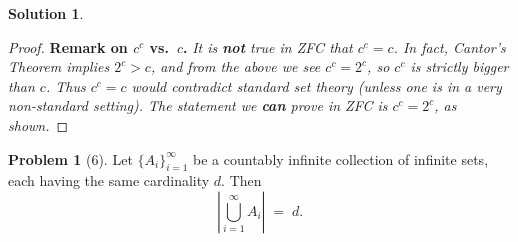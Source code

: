 \documentclass[12pt]{article}
\theoremstyle{definition} %
\newtheorem{solution}{Solution}
\newtheorem{problem}{Problem}
\theoremstyle{plain} %
\begin{document}
\begin{solution}
\begin{proof}
                \medskip
                \noindent
                \textbf{Remark on $c^c$ vs.\ $c$.} 
                \emph{It is \textbf{not} true in ZFC that $c^c = c$.  In fact, Cantor's Theorem implies $2^c > c$, and from the above we see $c^c = 2^c$, so $c^c$ is strictly bigger than $c$.  Thus $c^c = c$ would contradict standard set theory (unless one is in a very non-standard setting).  The statement we \textbf{can} prove in ZFC is $c^c = 2^c$, as shown.}
                
                \end{proof}
               
        \end{solution}

\begin{problem}[6]
    \label{thm:countable_union_same_card}
    Let $\{A_i\}_{i=1}^\infty$ be a countably infinite collection of infinite sets, each having the same cardinality $d$. Then
    \[
       \left|\bigcup_{i=1}^\infty A_i\right| \;=\; d.
    \]
\end{problem}
\end{document}
